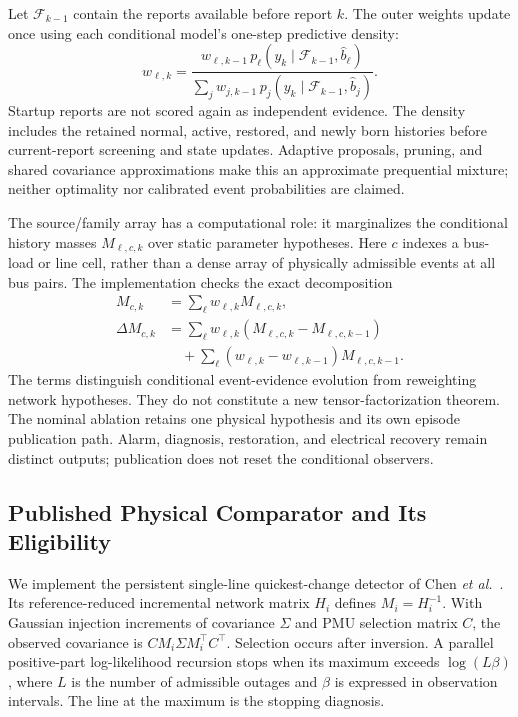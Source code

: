 Let $\mathcal F_{k-1}$ contain the reports available before report $k$. The outer weights update once using each conditional model's one-step predictive density:
\begin{equation}
 w_{\ell,k}=\frac{w_{\ell,k-1}\,
 p_\ell(y_k\mid\mathcal F_{k-1},\widehat b_\ell)}
 {\sum_j w_{j,k-1}\,
 p_j(y_k\mid\mathcal F_{k-1},\widehat b_j)}.
 \label{eq:continuous-weights}
\end{equation}
Startup reports are not scored again as independent evidence. The density includes the retained normal, active, restored, and newly born histories before current-report screening and state updates. Adaptive proposals, pruning, and shared covariance approximations make this an approximate prequential mixture; neither optimality nor calibrated event probabilities are claimed.

The source/family array has a computational role: it marginalizes the conditional history masses $M_{\ell,c,k}$ over static parameter hypotheses. Here $c$ indexes a bus-load or line cell, rather than a dense array of physically admissible events at all bus pairs. The implementation checks the exact decomposition
\begin{align}
 M_{c,k}&=\sum_\ell w_{\ell,k} M_{\ell,c,k},\nonumber\\
 \Delta M_{c,k}&=\sum_\ell w_{\ell,k}
 (M_{\ell,c,k}-M_{\ell,c,k-1})\nonumber\\
 &\quad+\sum_\ell(w_{\ell,k}-w_{\ell,k-1})M_{\ell,c,k-1}.
 \label{eq:continuous-delta}
\end{align}
The terms distinguish conditional event-evidence evolution from reweighting network hypotheses. They do not constitute a new tensor-factorization theorem. The nominal ablation retains one physical hypothesis and its own episode publication path. Alarm, diagnosis, restoration, and electrical recovery remain distinct outputs; publication does not reset the conditional observers.

\subsection{Published Physical Comparator and Its Eligibility}
\label{sec:chen-comparator}

We implement the persistent single-line quickest-change detector of Chen \emph{et al.}~\cite{chen2016quickest}. Its reference-reduced incremental network matrix $H_i$ defines $M_i=H_i^{-1}$. With Gaussian injection increments of covariance $\Sigma$ and PMU selection matrix $C$, the observed covariance is $C M_i\Sigma M_i^\top C^\top$. Selection occurs after inversion. A parallel positive-part log-likelihood recursion stops when its maximum exceeds $\log(L\beta)$, where $L$ is the number of admissible outages and $\beta$ is expressed in observation intervals. The line at the maximum is the stopping diagnosis.

